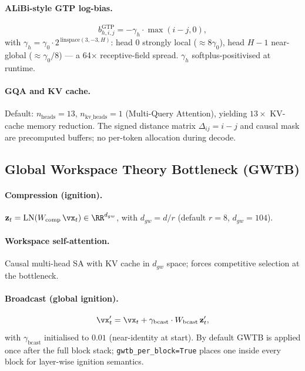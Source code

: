 \paragraph{ALiBi-style GTP log-bias.}
\begin{equation}
  b^\text{GTP}_{h,i,j} = -\gamma_h\cdot\max(i-j,0),
\end{equation}
with $\gamma_h = \gamma_0\cdot 2^{\,\text{linspace}(3,-3,H)}$: head 0 strongly local ($\approx 8\gamma_0$), head $H-1$ near-global ($\approx\gamma_0/8$) — a 64$\times$ receptive-field spread. $\gamma_h$ softplus-positivised at runtime.

\paragraph{GQA and KV cache.}
Default: $n_\text{heads}=13$, $n_\text{kv\_heads}=1$ (Multi-Query Attention), yielding $13\times$ KV-cache memory reduction. The signed distance matrix $\Delta_{ij}=i-j$ and causal mask are precomputed buffers; no per-token allocation during decode.

\subsection{Global Workspace Theory Bottleneck (GWTB)}
\label{sec:gwtb}

\paragraph{Compression (ignition).}
$\mathbf{z}_t = \mathrm{LN}(W_\text{comp}\,\vx_t)\in\RR^{d_{gw}}$, with $d_{gw}=d/r$ (default $r=8$, $d_{gw}=104$).

\paragraph{Workspace self-attention.}
Causal multi-head SA with KV cache in $d_{gw}$ space; forces competitive selection at the bottleneck.

\paragraph{Broadcast (global ignition).}
\begin{equation}
  \vx'_t = \vx_t + \gamma_\text{bcast}\cdot W_\text{bcast}\,\mathbf{z}'_t,
\end{equation}
with $\gamma_\text{bcast}$ initialised to $0.01$ (near-identity at start). By default GWTB is applied once after the full block stack; \texttt{gwtb\_per\_block=True} places one inside every block for layer-wise ignition semantics.

